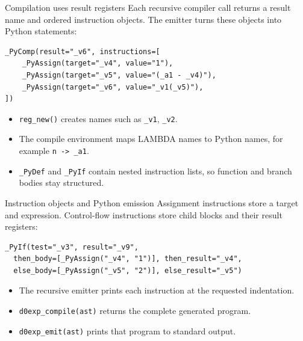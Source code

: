 \documentclass[aspectratio=169,10pt]{beamer}
\begin{document}
\begin{frame}[fragile]{Compilation uses result registers}
  Each recursive compiler call returns a result name and ordered instruction
  objects. The emitter turns these objects into Python statements:
  \begin{lstlisting}
_PyComp(result="_v6", instructions=[
    _PyAssign(target="_v4", value="1"),
    _PyAssign(target="_v5", value="(_a1 - _v4)"),
    _PyAssign(target="_v6", value="_v1(_v5)"),
])
  \end{lstlisting}
  \begin{itemize}
    \item \texttt{reg\_new()} creates names such as \texttt{\_v1}, \texttt{\_v2}.
    \item The compile environment maps LAMBDA names to Python names, for example \texttt{n -> \_a1}.
    \item \texttt{\_PyDef} and \texttt{\_PyIf} contain nested instruction lists, so function and branch bodies stay structured.
  \end{itemize}
\end{frame}

\begin{frame}[fragile]{Instruction objects and Python emission}
  Assignment instructions store a target and expression. Control-flow
  instructions store child blocks and their result registers:
  \begin{lstlisting}
_PyIf(test="_v3", result="_v9",
  then_body=[_PyAssign("_v4", "1")], then_result="_v4",
  else_body=[_PyAssign("_v5", "2")], else_result="_v5")
  \end{lstlisting}
  \begin{itemize}
    \item The recursive emitter prints each instruction at the requested indentation.
    \item \texttt{d0exp\_compile(ast)} returns the complete generated program.
    \item \texttt{d0exp\_emit(ast)} prints that program to standard output.
  \end{itemize}
\end{frame}
\end{document}

